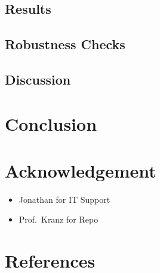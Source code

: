 \documentclass[
]{article}
\providecommand{\tightlist}{%
  \setlength{\itemsep}{0pt}\setlength{\parskip}{0pt}}\usepackage{longtable,booktabs,array}
\begin{document}
\subsection{Results}\label{results}

\subsection{Robustness Checks}\label{robustness-checks}

\subsection{Discussion}\label{discussion}

\section{Conclusion}\label{conclusion}

\section{Acknowledgement}\label{acknowledgement}

\begin{itemize}
\tightlist
\item
  Jonathan for IT Support
\item
  Prof.~Kranz for Repo
\end{itemize}

\newpage{}

\section{References}\label{references}
\end{document}
